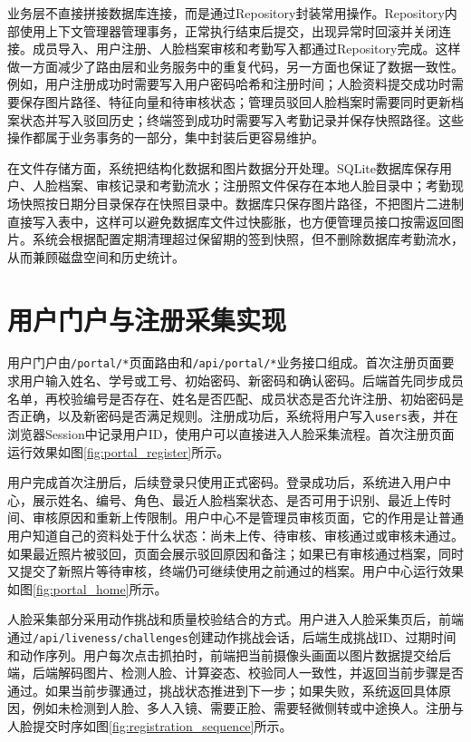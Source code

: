 业务层不直接拼接数据库连接，而是通过Repository封装常用操作。Repository内部使用上下文管理器管理事务，正常执行结束后提交，出现异常时回滚并关闭连接。成员导入、用户注册、人脸档案审核和考勤写入都通过Repository完成。这样做一方面减少了路由层和业务服务中的重复代码，另一方面也保证了数据一致性。例如，用户注册成功时需要写入用户密码哈希和注册时间；人脸资料提交成功时需要保存图片路径、特征向量和待审核状态；管理员驳回人脸档案时需要同时更新档案状态并写入驳回历史；终端签到成功时需要写入考勤记录并保存快照路径。这些操作都属于业务事务的一部分，集中封装后更容易维护。

在文件存储方面，系统把结构化数据和图片数据分开处理。SQLite数据库保存用户、人脸档案、审核记录和考勤流水；注册照文件保存在本地人脸目录中；考勤现场快照按日期分目录保存在快照目录中。数据库只保存图片路径，不把图片二进制直接写入表中，这样可以避免数据库文件过快膨胀，也方便管理员接口按需返回图片。系统会根据配置定期清理超过保留期的签到快照，但不删除数据库考勤流水，从而兼顾磁盘空间和历史统计。

\section{用户门户与注册采集实现}

用户门户由\texttt{/portal/*}页面路由和\texttt{/api/portal/*}业务接口组成。首次注册页面要求用户输入姓名、学号或工号、初始密码、新密码和确认密码。后端首先同步成员名单，再校验编号是否存在、姓名是否匹配、成员状态是否允许注册、初始密码是否正确，以及新密码是否满足规则。注册成功后，系统将用户写入\texttt{users}表，并在浏览器Session中记录用户ID，使用户可以直接进入人脸采集流程。首次注册页面运行效果如图\ref{fig:portal_register}所示。


用户完成首次注册后，后续登录只使用正式密码。登录成功后，系统进入用户中心，展示姓名、编号、角色、最近人脸档案状态、是否可用于识别、最近上传时间、审核原因和重新上传限制。用户中心不是管理员审核页面，它的作用是让普通用户知道自己的资料处于什么状态：尚未上传、待审核、审核通过或审核未通过。如果最近照片被驳回，页面会展示驳回原因和备注；如果已有审核通过档案，同时又提交了新照片等待审核，终端仍可继续使用之前通过的档案。用户中心运行效果如图\ref{fig:portal_home}所示。


人脸采集部分采用动作挑战和质量校验结合的方式。用户进入人脸采集页后，前端通过\texttt{/api/liveness/challenges}创建动作挑战会话，后端生成挑战ID、过期时间和动作序列。用户每次点击抓拍时，前端把当前摄像头画面以图片数据提交给后端，后端解码图片、检测人脸、计算姿态、校验同人一致性，并返回当前步骤是否通过。如果当前步骤通过，挑战状态推进到下一步；如果失败，系统返回具体原因，例如未检测到人脸、多人入镜、需要正脸、需要轻微侧转或中途换人。注册与人脸提交时序如图\ref{fig:registration_sequence}所示。


